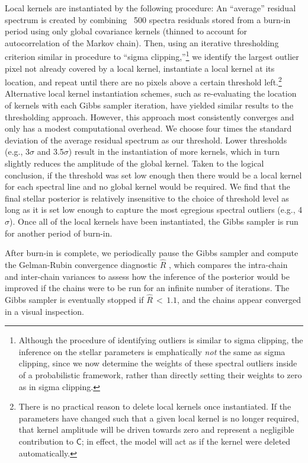 \documentclass[iop,floatfix]{emulateapj}
\newcommand{\vC}{\mathsf{C}}
\begin{document}
Local kernels are instantiated by the following procedure:  An ``average''
residual spectrum is created by combining ~500 spectra residuals stored from a
burn-in period using only global covariance kernels (thinned to account for
autocorrelation of the Markov chain). Then, using an iterative thresholding
criterion similar in procedure to
``sigma clipping,''\footnote{Although the procedure of identifying outliers is
  similar to sigma clipping, the inference on the stellar parameters is
  emphatically \emph{not} the same as sigma clipping, since we now determine
the weights of these spectral outliers inside of a probabilistic framework, rather than
directly setting their weights to zero as in sigma clipping.} we identify the largest outlier
pixel not already covered by a local kernel, instantiate a local kernel at its location, and repeat until there are no pixels above a certain
threshold left.\footnote{There is no practical
  reason to delete local kernels once instantiated.  If the parameters have
  changed such that a given local kernel is no longer required, that kernel
  amplitude will be driven towards zero and represent a negligible contribution
  to $\vC$; in effect, the model will act as if the kernel were deleted
automatically.} Alternative local kernel instantiation schemes,
such as re-evaluating the location of kernels with each Gibbs sampler
iteration, have yielded similar results to the thresholding approach. However, this approach most consistently converges and only has a modest computational overhead. We choose four times the standard deviation of the average residual spectrum as our threshold. Lower thresholds (e.g., 3$\sigma$ and 3.5$\sigma$) result in the instantiation of more kernels, which in turn slightly reduces the amplitude of the global kernel. Taken to the logical conclusion, if the threshold was set low enough then there would be a local kernel for each spectral line and no global kernel would be required. We find that the final stellar posterior is relatively insensitive to the choice of threshold level as long as it is set low enough to capture the most egregious spectral outliers (e.g., 4$\sigma$). Once all of the local kernels have been instantiated, the Gibbs sampler is run for another period of burn-in.

After burn-in is complete, we periodically pause the Gibbs sampler and compute the Gelman-Rubin convergence 
diagnostic  $\hat{R}$ \citep[][their Eq.~11.4]{gelman13}, which compares the intra-chain and 
inter-chain variances to assess how the inference of the posterior would be improved if the chains 
were to be run for an infinite number of iterations.  The Gibbs sampler is eventually stopped if 
$\hat{R} \, < \, 1.1$, and the chains appear converged in a visual inspection. 
\end{document}
